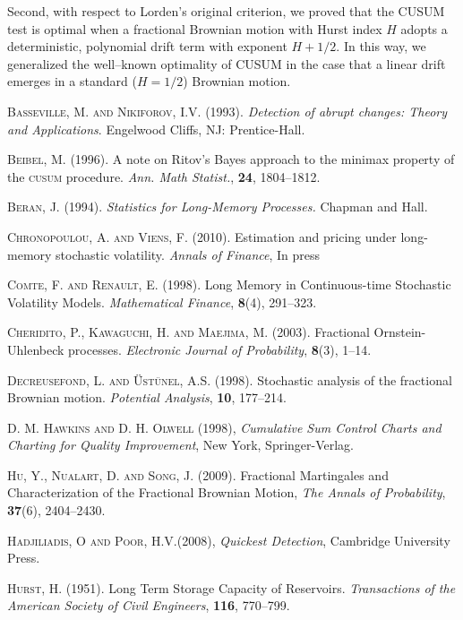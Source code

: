 \documentclass[11pt,reqno]{amsart}
\theoremstyle{remark}
\begin{document}
Second, with respect to Lorden's original criterion, we proved that the CUSUM test is optimal when a fractional Brownian motion with Hurst index $H$ adopts a deterministic, polynomial drift term with exponent $H+1/2$. In this way, we generalized the well--known optimality of CUSUM in the case that a linear drift emerges in a standard ($H=1/2$) Brownian motion.

\begin{thebibliography}{99}
\footnotesize

 \textsc{Basseville, M. and Nikiforov, I.V.} (1993). \emph{Detection of abrupt changes: Theory and Applications}. Engelwood Cliffs, NJ: Prentice-Hall.

 \textsc{Beibel, M.} (1996). A note on Ritov's Bayes approach to the minimax property of the \textsc{cusum} procedure. {\em Ann. Math Statist.}, \textbf{24}, 1804--1812.
 
 \textsc{Beran, J.} (1994). \emph{Statistics for Long-Memory Processes. } Chapman and Hall.

 \textsc{Chronopoulou, A. and Viens, F.} (2010). Estimation and pricing under long-memory stochastic volatility. {\em Annals of Finance}, In press

 \textsc{Comte, F. and Renault, E.} (1998). Long Memory in
Continuous-time Stochastic Volatility Models. \emph{Mathematical Finance},
\textbf{8}(4), 291--323.

 \textsc{Cheridito, P., Kawaguchi, H. and Maejima, M.} (2003). Fractional Ornstein-Uhlenbeck processes. {\em Electronic Journal of Probability}, \textbf{8}(3), 1--14.

 \textsc{Decreusefond, L. and \"Ust\"unel, A.S.} (1998). Stochastic analysis of the fractional Brownian motion. {\em Potential Analysis}, \textbf{10}, 177--214.

 \textsc{D. M. Hawkins and D. H. Olwell} (1998), {\em Cumulative Sum Control Charts and Charting for Quality Improvement}, New York,
Springer-Verlag.

 \textsc{Hu, Y., Nualart, D. and Song, J.} (2009). Fractional Martingales and Characterization of the Fractional Brownian Motion,
\emph{The Annals of Probability}, \textbf{37}(6), 2404--2430.

 \textsc{Hadjiliadis, O and Poor, H.V.}(2008), {\em Quickest Detection}, Cambridge University Press. 

 \textsc{Hurst, H.} (1951). Long Term Storage Capacity of Reservoirs. \emph{Transactions of the American Society of Civil Engineers}, \textbf{116}, 770--799.


\end{thebibliography}
\end{document}
